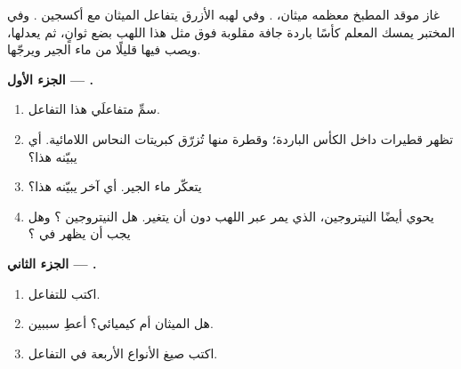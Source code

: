 \begin{problem}
\label{pb:g7:chemical-reactions:1}
غاز موقد المطبخ معظمه ميثان، . وفي لهبه الأزرق يتفاعل الميثان مع
أكسجين . وفي المختبر يمسك المعلم كأسًا باردة جافة مقلوبة فوق مثل هذا
اللهب بضع ثوانٍ، ثم يعدلها، ويصب فيها قليلًا من ماء الجير
ويرجّها.

\medskip
\noindent\textbf{الجزء الأول ---  .}
\begin{enumerate}
  \item سمِّ متفاعلَي هذا التفاعل.
  \item تظهر قطيرات داخل الكأس الباردة؛ وقطرة منها تُزرّق كبريتات النحاس
        اللامائية. أي  يبيّنه هذا؟
  \item يتعكّر ماء الجير. أي  آخر يبيّنه هذا؟
  \item يحوي  أيضًا النيتروجين، الذي يمر عبر اللهب دون أن يتغير.
        هل النيتروجين ؟ وهل يجب أن يظهر في ؟
\end{enumerate}

\medskip
\noindent\textbf{الجزء الثاني --- .}
\begin{enumerate}[resume]
  \item اكتب  للتفاعل.
  \item هل  الميثان  أم كيميائي؟ أعطِ
        سببين.
  \item اكتب صيغ الأنواع الأربعة في التفاعل.
\end{enumerate}


\end{problem}
